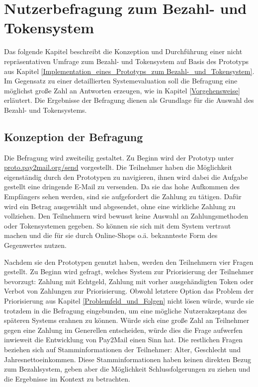 
\chapter{Nutzerbefragung zum Bezahl- und Tokensystem}
\label{Nutzerbefragung_zum Bezahl-_und_Tokensystem}
Das folgende Kapitel beschreibt die Konzeption und Durchführung einer nicht repräsentativen Umfrage zum Bezahl- und Tokensystem auf Basis des Prototyps aus Kapitel \ref{Implementation_eines_Prototyps_zum Bezahl-_und_Tokensystem}. Im Gegensatz zu einer detaillierten Systemevaluation soll die Befragung eine möglichst große Zahl an Antworten erzeugen, wie in Kapitel \ref{Vorgehensweise} erläutert. Die Ergebnisse der Befragung dienen als Grundlage für die Auswahl des Bezahl- und Tokensystems.

\section{Konzeption der Befragung}
Die Befragung wird zweiteilig gestaltet. Zu Beginn wird der Prototyp unter \\ \url{proto.pay2mail.org/send} vorgestellt. Die Teilnehmer haben die Möglichkeit eigenständig durch den Prototypen zu navigieren, ihnen wird dabei die Aufgabe gestellt eine dringende E-Mail zu versenden. Da sie das hohe Aufkommen des Empfängers sehen werden, sind sie aufgefordert die Zahlung zu tätigen. Dafür wird ein Betrag ausgewählt und abgesendet, ohne eine wirkliche Zahlung zu vollziehen. Den Teilnehmern wird bewusst keine Auswahl an Zahlungsmethoden oder Tokensystemen gegeben. So können sie sich mit dem System vertraut machen und die für sie durch Online-Shops o.ä. bekannteste Form des Gegenwertes nutzen.

Nachdem sie den Prototypen genutzt haben, werden den Teilnehmern vier Fragen gestellt. Zu Beginn wird gefragt, welches System zur Priorisierung der Teilnehmer bevorzugt: Zahlung mit Echtgeld, Zahlung mit vorher ausgehändigten Token oder Verbot von Zahlungen zur Priorisierung. Obwohl letztere Option das Problem der Priorisierung aus Kapitel \ref{Problemfeld_und_Folgen} nicht lösen würde, wurde sie trotzdem in die Befragung eingebunden, um eine mögliche Nutzerakzeptanz des späteren Systems erahnen zu können. Würde sich eine große Zahl an Teilnehmer gegen eine Zahlung im Generellen entscheiden, würde dies die Frage aufwerfen inwieweit die Entwicklung von Pay2Mail einen Sinn hat. Die restlichen Fragen beziehen sich auf Stamminformationen der Teilnehmer: Alter, Geschlecht und Jahresnettoeinkommen. Diese Stamminformationen haben keinen direkten Bezug zum Bezahlsystem, geben aber die Möglichkeit Schlussfolgerungen zu ziehen und die Ergebnisse im Kontext zu betrachten. 

